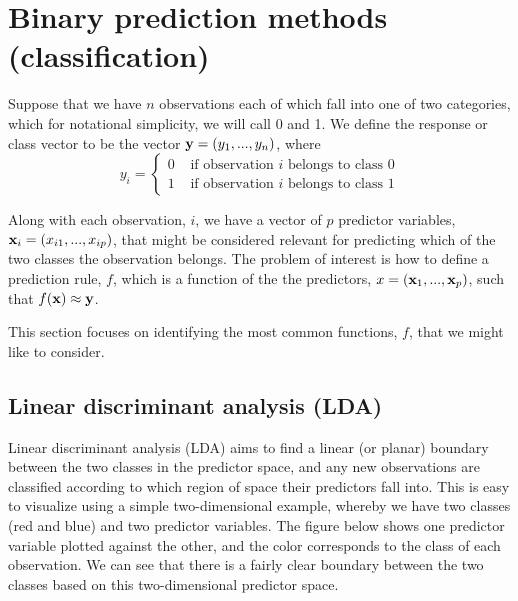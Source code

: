 

\chapter{Binary prediction methods (classification)}
\label{ch:class}



Suppose that we have $n$ observations each of which fall into one of two categories, which for notational simplicity, we will call 0 and 1. We define the response or class vector to be the vector ${\bf y} = (y_1, ..., y_n)$, where 
$$y_i = \begin{cases} 0 & \text{ if observation $i$ belongs to class $0$}\\ 1 & \text{ if observation $i$ belongs to class $1$} \end{cases}$$

Along with each observation, $i$, we have a vector of $p$ predictor variables, ${\bf x}_i =  (x_{i1}, ..., x_{ip})$, that might be considered relevant for predicting which of the two classes the observation belongs. The problem of interest is how to define a prediction rule, $f$, which is a function of the the predictors, $x = ({\bf x}_1, ..., {\bf x}_p)$, such that $f({\bf x}) \approx {\bf y}$. 

This section focuses on identifying the most common functions, $f$, that we might like to consider.




\section{Linear discriminant analysis (LDA)}

Linear discriminant analysis (LDA) aims to find a linear (or planar) boundary between the two classes in the predictor space, and any new observations are classified according to which region of space their predictors fall into. This is easy to visualize using a simple two-dimensional example, whereby we have two classes (red and blue) and two predictor variables. The figure below shows one predictor variable plotted against the other, and the color corresponds to the class of each observation. We can see that there is a fairly clear boundary between the two classes based on this two-dimensional predictor space.

